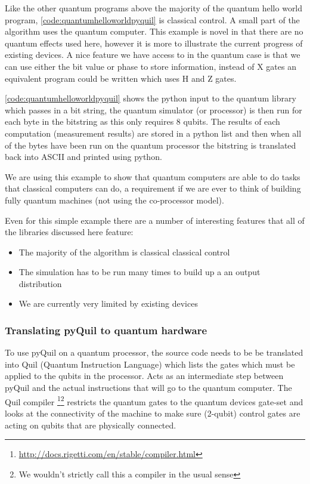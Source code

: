 Like the other quantum programs above the majority of the quantum hello world program, \autoref{code:quantumhelloworldpyquil} is classical control. A small part of the algorithm uses the quantum computer. This example is novel in that there are no quantum effects used here, however it is more to illustrate the current progress of existing devices. A nice feature we have access to in the quantum case is that we can use either the bit value or phase to store information, instead of X gates an equivalent program could be written which uses H and Z gates.

\autoref{code:quantumhelloworldpyquil} shows the python input to the quantum library which passes in a bit string, the quantum simulator (or processor) is then run for each byte in the bitstring as this only requires 8 qubits. The results of each computation (measurement results) are stored in a python list and then when all of the bytes have been run on the quantum processor the bitstring is translated back into ASCII and printed using python.

We are using this example to show that quantum computers are able to do tasks that classical computers can do, a requirement if we are ever to think of building fully quantum machines (not using the co-processor model).

Even for this simple example there are a number of interesting features that all of the libraries discussed here feature:
\begin{itemize}
    \item The majority of the algorithm is classical classical control 
    \item The simulation has to be run many times to build up a an output distribution
    \item We are currently very limited by existing devices
\end{itemize}

\subsubsection{Translating pyQuil to quantum hardware}

To use pyQuil on a quantum processor, the source code needs to be be translated into Quil (Quantum Instruction Language) which lists the gates which must be applied to the qubits in the processor. Acts as an intermediate step between pyQuil and the actual instructions that will go to the quantum computer. The Quil compiler \footnote{\url{http://docs.rigetti.com/en/stable/compiler.html}}\footnote{We wouldn't strictly call this a compiler in the usual sense} restricts the quantum gates to the quantum devices gate-set and looks at the connectivity of the machine to make sure (2-qubit) control gates are acting on qubits that are physically connected. 

